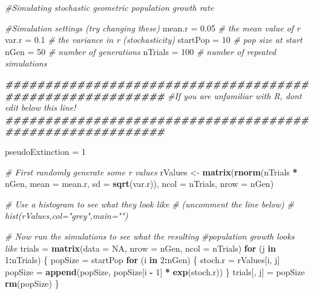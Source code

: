 \documentclass[
  a4paper]{book}
\newenvironment{Shaded}{\begin{snugshade}}{\end{snugshade}}
\newcommand{\AttributeTok}[1]{\textcolor[rgb]{0.13,0.29,0.53}{#1}}
\newcommand{\CommentTok}[1]{\textcolor[rgb]{0.56,0.35,0.01}{\textit{#1}}}
\newcommand{\ConstantTok}[1]{\textcolor[rgb]{0.56,0.35,0.01}{#1}}
\newcommand{\ControlFlowTok}[1]{\textcolor[rgb]{0.13,0.29,0.53}{\textbf{#1}}}
\newcommand{\DecValTok}[1]{\textcolor[rgb]{0.00,0.00,0.81}{#1}}
\newcommand{\DocumentationTok}[1]{\textcolor[rgb]{0.56,0.35,0.01}{\textbf{\textit{#1}}}}
\newcommand{\FloatTok}[1]{\textcolor[rgb]{0.00,0.00,0.81}{#1}}
\newcommand{\FunctionTok}[1]{\textcolor[rgb]{0.13,0.29,0.53}{\textbf{#1}}}
\newcommand{\NormalTok}[1]{#1}
\newcommand{\OtherTok}[1]{\textcolor[rgb]{0.56,0.35,0.01}{#1}}
\newcommand{\SpecialCharTok}[1]{\textcolor[rgb]{0.81,0.36,0.00}{\textbf{#1}}}
\begin{document}
\begin{Shaded}
\begin{Highlighting}[]
\CommentTok{\#Simulating stochastic geometric population growth rate}

\CommentTok{\#Simulation settings (try changing these)}
\NormalTok{mean.r }\OtherTok{=} \FloatTok{0.05} \CommentTok{\# the mean value of r}
\NormalTok{var.r }\OtherTok{=} \FloatTok{0.1} \CommentTok{\# the variance in r (stochasticity)}
\NormalTok{startPop }\OtherTok{=} \DecValTok{10} \CommentTok{\# pop size at start}
\NormalTok{nGen }\OtherTok{=} \DecValTok{50} \CommentTok{\# number of generations}
\NormalTok{nTrials }\OtherTok{=} \DecValTok{100} \CommentTok{\# number of repeated simulations}

\DocumentationTok{\#\#\#\#\#\#\#\#\#\#\#\#\#\#\#\#\#\#\#\#\#\#\#\#\#\#\#\#\#\#\#\#\#\#\#\#\#\#\#\#\#\#\#\#\#\#\#\#\#\#\#\#\#\#\#\#\#\#}
\CommentTok{\#If you are unfamiliar with R, don\textquotesingle{}t edit below this line!}
\DocumentationTok{\#\#\#\#\#\#\#\#\#\#\#\#\#\#\#\#\#\#\#\#\#\#\#\#\#\#\#\#\#\#\#\#\#\#\#\#\#\#\#\#\#\#\#\#\#\#\#\#\#\#\#\#\#\#\#\#\#\#}

\NormalTok{pseudoExtinction }\OtherTok{=} \DecValTok{1}

\CommentTok{\# First randomly generate some r values}
\NormalTok{rValues }\OtherTok{\textless{}{-}} \FunctionTok{matrix}\NormalTok{(}\FunctionTok{rnorm}\NormalTok{(nTrials }\SpecialCharTok{*}\NormalTok{ nGen, }
                        \AttributeTok{mean =}\NormalTok{ mean.r, }
                        \AttributeTok{sd =} \FunctionTok{sqrt}\NormalTok{(var.r)),}
                  \AttributeTok{ncol =}\NormalTok{ nTrials,}
                  \AttributeTok{nrow =}\NormalTok{ nGen)}

\CommentTok{\# Use a histogram to see what they look like }
\CommentTok{\# (uncomment the line below)}
\CommentTok{\# hist(rValues,col="grey",main="")}

\CommentTok{\# Now run the simulations to see what the resulting }
\CommentTok{\#population growth looks like}
\NormalTok{trials }\OtherTok{=} \FunctionTok{matrix}\NormalTok{(}\AttributeTok{data =} \ConstantTok{NA}\NormalTok{, }\AttributeTok{nrow =}\NormalTok{ nGen, }\AttributeTok{ncol =}\NormalTok{ nTrials)}
\ControlFlowTok{for}\NormalTok{ (j }\ControlFlowTok{in} \DecValTok{1}\SpecialCharTok{:}\NormalTok{nTrials) \{}
\NormalTok{  popSize }\OtherTok{=}\NormalTok{ startPop}
  \ControlFlowTok{for}\NormalTok{ (i }\ControlFlowTok{in} \DecValTok{2}\SpecialCharTok{:}\NormalTok{nGen) \{}
\NormalTok{    stoch.r }\OtherTok{=}\NormalTok{ rValues[i, j]}
\NormalTok{    popSize }\OtherTok{=} \FunctionTok{append}\NormalTok{(popSize, popSize[i }\SpecialCharTok{{-}} \DecValTok{1}\NormalTok{] }\SpecialCharTok{*} \FunctionTok{exp}\NormalTok{(stoch.r))}
\NormalTok{  \}}
\NormalTok{  trials[, j] }\OtherTok{=}\NormalTok{ popSize}
  \FunctionTok{rm}\NormalTok{(popSize)}
\NormalTok{\}}


\end{Highlighting}
\end{Shaded}
\end{document}
